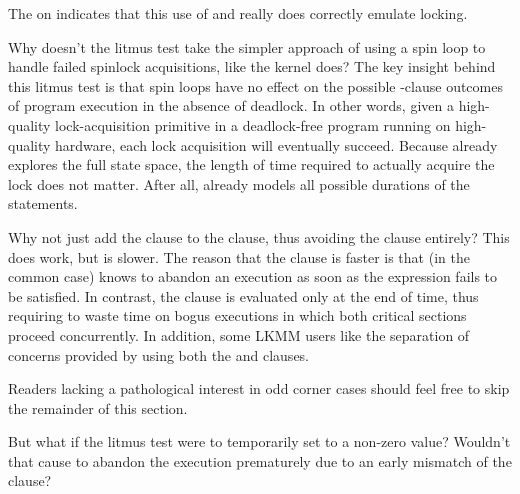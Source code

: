 \begin{fcvref}
The  on  indicates that this use of 
and  really does correctly emulate locking.
\end{fcvref}

Why doesn't the litmus test take the simpler approach of using a spin loop
to handle failed spinlock acquisitions, like the kernel does?
The key insight behind this litmus test is that spin loops have no effect
on the possible -clause outcomes of program execution in the absence
of deadlock.
In other words, given a high-quality lock-acquisition primitive in a
deadlock-free program running on high-quality hardware, each lock
acquisition will eventually succeed.
Because  already explores the full state space, the length of
time required to actually acquire the lock does not matter.
After all,  already models all possible durations of the
 statements.

Why not just add the  clause to the  clause, thus
avoiding the  clause entirely?
This does work, but is slower.
The reason that the  clause is faster is that (in the common case)
 knows to abandon an execution as soon as the  expression
fails to be satisfied.
In contrast, the  clause is evaluated only at the end of time,
thus requiring  to waste time on bogus executions in which both
critical sections proceed concurrently.
In addition, some LKMM users like the separation of concerns provided by
using both the  and  clauses.

Readers lacking a pathological interest in odd corner cases should feel
free to skip the remainder of this section.

But what if the litmus test were to temporarily set  to a non-zero
value?
Wouldn't that cause  to abandon the execution prematurely
due to an early mismatch of the  clause?


